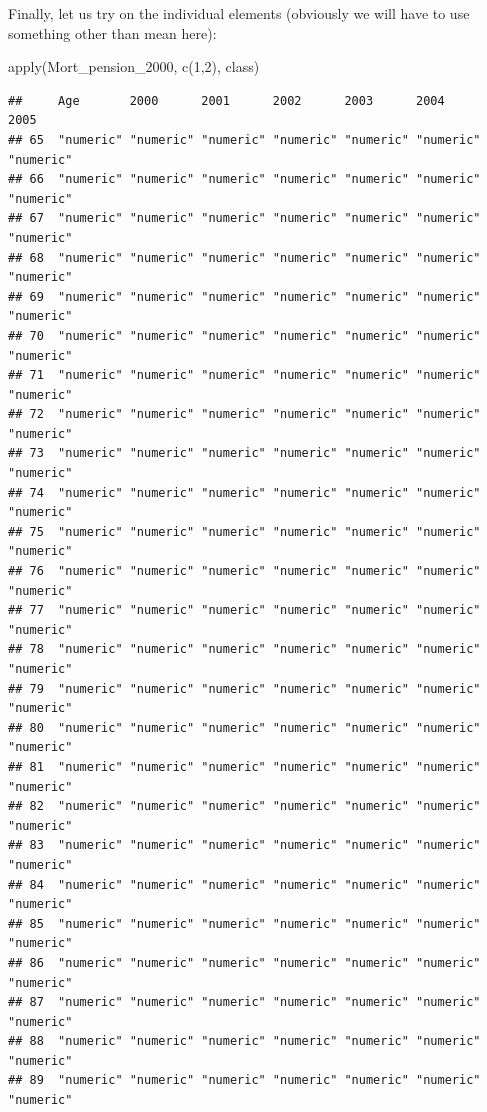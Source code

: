 \documentclass[
]{book}
\newenvironment{Shaded}{\begin{snugshade}}{\end{snugshade}}
\newcommand{\DecValTok}[1]{\textcolor[rgb]{0.00,0.00,0.81}{#1}}
\newcommand{\FunctionTok}[1]{\textcolor[rgb]{0.00,0.00,0.00}{#1}}
\newcommand{\NormalTok}[1]{#1}
\theoremstyle{definition}
\theoremstyle{definition}
\theoremstyle{definition}
\theoremstyle{definition}
\theoremstyle{remark}
\begin{document}
Finally, let us try on the individual elements (obviously we will have to use something other than mean here):

\begin{Shaded}
\begin{Highlighting}[]
\FunctionTok{apply}\NormalTok{(Mort\_pension\_2000, }\FunctionTok{c}\NormalTok{(}\DecValTok{1}\NormalTok{,}\DecValTok{2}\NormalTok{), class)}
\end{Highlighting}
\end{Shaded}

\begin{verbatim}
##     Age       2000      2001      2002      2003      2004      2005     
## 65  "numeric" "numeric" "numeric" "numeric" "numeric" "numeric" "numeric"
## 66  "numeric" "numeric" "numeric" "numeric" "numeric" "numeric" "numeric"
## 67  "numeric" "numeric" "numeric" "numeric" "numeric" "numeric" "numeric"
## 68  "numeric" "numeric" "numeric" "numeric" "numeric" "numeric" "numeric"
## 69  "numeric" "numeric" "numeric" "numeric" "numeric" "numeric" "numeric"
## 70  "numeric" "numeric" "numeric" "numeric" "numeric" "numeric" "numeric"
## 71  "numeric" "numeric" "numeric" "numeric" "numeric" "numeric" "numeric"
## 72  "numeric" "numeric" "numeric" "numeric" "numeric" "numeric" "numeric"
## 73  "numeric" "numeric" "numeric" "numeric" "numeric" "numeric" "numeric"
## 74  "numeric" "numeric" "numeric" "numeric" "numeric" "numeric" "numeric"
## 75  "numeric" "numeric" "numeric" "numeric" "numeric" "numeric" "numeric"
## 76  "numeric" "numeric" "numeric" "numeric" "numeric" "numeric" "numeric"
## 77  "numeric" "numeric" "numeric" "numeric" "numeric" "numeric" "numeric"
## 78  "numeric" "numeric" "numeric" "numeric" "numeric" "numeric" "numeric"
## 79  "numeric" "numeric" "numeric" "numeric" "numeric" "numeric" "numeric"
## 80  "numeric" "numeric" "numeric" "numeric" "numeric" "numeric" "numeric"
## 81  "numeric" "numeric" "numeric" "numeric" "numeric" "numeric" "numeric"
## 82  "numeric" "numeric" "numeric" "numeric" "numeric" "numeric" "numeric"
## 83  "numeric" "numeric" "numeric" "numeric" "numeric" "numeric" "numeric"
## 84  "numeric" "numeric" "numeric" "numeric" "numeric" "numeric" "numeric"
## 85  "numeric" "numeric" "numeric" "numeric" "numeric" "numeric" "numeric"
## 86  "numeric" "numeric" "numeric" "numeric" "numeric" "numeric" "numeric"
## 87  "numeric" "numeric" "numeric" "numeric" "numeric" "numeric" "numeric"
## 88  "numeric" "numeric" "numeric" "numeric" "numeric" "numeric" "numeric"
## 89  "numeric" "numeric" "numeric" "numeric" "numeric" "numeric" "numeric"

\end{verbatim}
\end{document}
